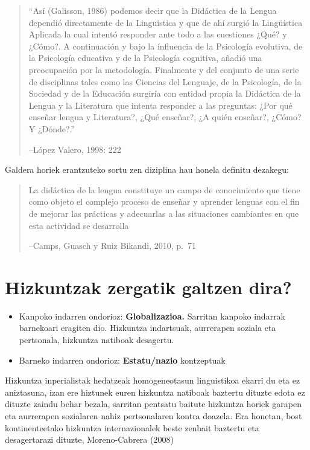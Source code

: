 \documentclass[]{book}
\providecommand{\tightlist}{%
  \setlength{\itemsep}{0pt}\setlength{\parskip}{0pt}}
\begin{document}
\begin{quote}
``Así (Galisson, 1986) podemos decir que la Didáctica de la Lengua dependió directamente de la Linguistica y que de ahí surgió la Lingüística Aplicada la cual intentó responder ante todo a las cuestiones ¿Qué? y ¿Cómo?. A continuación y bajo la ínfluencia de la Psicología evolutiva, de la Psicología educativa y de la Psicología cognitiva, añadió una preocupación por la metodología. Finalmente y del conjunto de una serie de disciplinas tales como las Ciencias del Lenguaje, de la Psicología, de la Sociedad y de la Educación surgiría con entidad propia la Didáctica de la Lengua y la Literatura que intenta responder a las preguntas: ¿Por qué enseñar lengua y Literatura?, ¿Qué enseñar?, ¿A quién enseñar?, ¿Cómo? Y ¿Dónde?.''

--López Valero, 1998: 222
\end{quote}

Galdera horiek erantzuteko sortu zen diziplina hau honela definitu dezakegu:

\begin{quote}
La didáctica de la lengua constituye un campo de conocimiento que tiene como objeto el complejo proceso de enseñar y aprender lenguas con el fin de mejorar las prácticas y adecuarlas a las situaciones cambiantes en que esta actividad se desarrolla

--Camps, Guasch y Ruiz Bikandi, 2010, p.~71
\end{quote}

\hypertarget{hizkuntzak-zergatik-galtzen-dira}{%
\section{Hizkuntzak zergatik galtzen dira?}\label{hizkuntzak-zergatik-galtzen-dira}}

\begin{itemize}
\tightlist
\item
  Kanpoko indarren ondorioz: \textbf{Globalizazioa.} Sarritan kanpoko
  indarrak barnekoari eragiten dio. Hizkuntza indartsuak,
  aurrerapen soziala eta pertsonala, hizkuntza natiboak desagertu.
\item
  Barneko indarren ondorioz: \textbf{Estatu/nazio} kontzeptuak
\end{itemize}

Hizkuntza inperialistak hedatzeak homogeneotasun linguistikoa ekarri du eta ez aniztasuna, izan ere hiztunek euren hizkuntza natiboak baztertu dituzte edota ez dituzte zaindu behar bezala, sarritan pentsatu baitute hizkuntza horiek garapen eta aurrerapen sozialaren nahiz pertsonalaren kontra doazela. Era honetan, bost kontinenteetako hizkuntza internazionalek beste zenbait baztertu eta desagertarazi dituzte, Moreno-Cabrera (2008)
\end{document}
